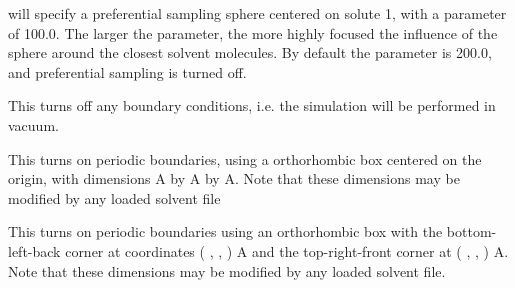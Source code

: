 \documentclass[letterpaper,10pt,english]{sphinxmanual}
\begin{document}
%
\begin{sphinxVerbatim}[commandchars=\\\{\}]
  
\end{sphinxVerbatim}

will specify a preferential sampling sphere centered on solute 1, with a parameter of 100.0. The larger the parameter, the more highly focused the influence of the sphere around the closest solvent molecules. By default the parameter is 200.0, and preferential sampling is turned off.

\ignorespaces 
\def\sphinxLiteralBlockLabel{\label{\detokenize{protoms:index-41}}}
%
\begin{sphinxVerbatim}[commandchars=\\\{\}]
 
\end{sphinxVerbatim}

This turns off any boundary conditions, i.e. the simulation will be performed in vacuum.

%
\begin{sphinxVerbatim}[commandchars=\\\{\}]
    
\end{sphinxVerbatim}

This turns on periodic boundaries, using a orthorhombic box centered on the origin, with dimensions  A by  A by  A. Note that these dimensions may be modified by any loaded solvent file

%
\begin{sphinxVerbatim}[commandchars=\\\{\}]
       
\end{sphinxVerbatim}

This turns on periodic boundaries using an orthorhombic box with the bottom-left-back corner at coordinates ( ,  , ) A and the top-right-front corner at ( ,  , ) A. Note that these dimensions may be modified by any loaded solvent file.
\end{document}
